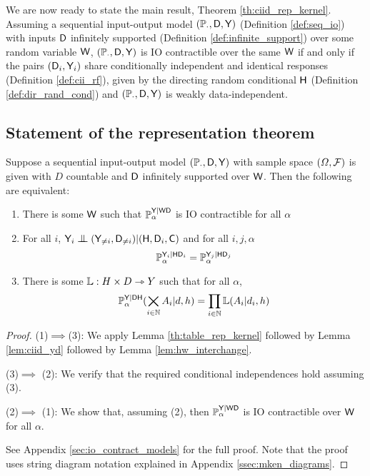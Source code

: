We are now ready to state the main result, Theorem \ref{th:ciid_rep_kernel}. Assuming a sequential input-output model $(\mathbb{P}_\cdot,\mathsf{D},\mathsf{Y})$ (Definition \ref{def:seq_io}) with inputs $\mathsf{D}$ infinitely supported (Definition \ref{def:infinite_support}) over some random variable $\mathsf{W}$, $(\mathbb{P}_\cdot,\mathsf{D},\mathsf{Y})$ is IO contractible over the same $\mathsf{W}$ if and only if the pairs $(\mathsf{D}_i, \mathsf{Y}_i)$ share conditionally independent and identical responses (Definition \ref{def:cii_rf}), given by the directing random conditional $\mathsf{H}$ (Definition \ref{def:dir_rand_cond}) and $(\mathbb{P}_\cdot,\mathsf{D},\mathsf{Y})$ is weakly data-independent.

\subsection{Statement of the representation theorem}\label{sec:reptheorem_statement}

\begin{theorem}\label{th:ciid_rep_kernel}
Suppose a sequential input-output model $(\mathbb{P}_\cdot,\mathsf{D},\mathsf{Y})$ with sample space $(\Omega,\mathcal{F})$ is given with $D$ countable and $\mathsf{D}$ infinitely supported over $\mathsf{W}$. Then the following are equivalent:
\begin{enumerate}
    \item There is some $\mathsf{W}$ such that $\mathbb{P}_\alpha^{\mathsf{Y}|\mathsf{WD}}$ is IO contractible for all $\alpha$
    \item For all $i$, $\RV{Y}_i\CI (\RV{Y}_{\neq i},\RV{D}_{\neq i})|(\RV{H}, \RV{D}_i, \RV{C})$ and for all $i,j, \alpha$ $$\mathbb{P}_\alpha^{\mathsf{Y}_i|\mathsf{H}\mathsf{D}_i}=\mathbb{P}_\alpha^{\mathsf{Y}_j|\mathsf{H}\mathsf{D}_j}$$
    \item There is some $\mathbb{L}:H\times D\rightarrowtriangle Y$ such that for all $\alpha$, $$\mathbb{P}_\alpha^{\mathsf{Y}|\mathsf{DH}}(\bigtimes_{i\in\mathbb{N}} A_{i}|d,h)= \prod_{i\in\mathbb{N}} \mathbb{L}(A_i|d_i,h)$$
\end{enumerate}
\end{theorem}

\begin{proof}
(1)$\implies$(3):
We apply Lemma \ref{th:table_rep_kernel} followed by Lemma \ref{lem:ciid_yd} followed by Lemma \ref{lem:hw_interchange}.


(3)$\implies$ (2):
We verify that the required conditional independences hold assuming (3).

(2)$\implies$ (1):
We show that, assuming (2), then $\mathbb{P}_\alpha^{\mathsf{Y}|\mathsf{WD}}$ is IO contractible over $\mathsf{W}$ for all $\alpha$.

See Appendix \ref{sec:io_contract_models} for the full proof. Note that the proof uses string diagram notation explained in Appendix \ref{ssec:mken_diagrams}.
\end{proof}

